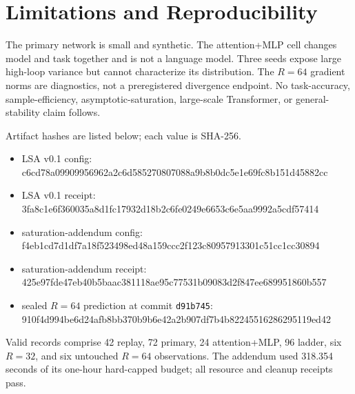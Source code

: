 \documentclass[10pt]{article}
\begin{document}
\section{Limitations and Reproducibility}

The primary network is small and synthetic. The attention+MLP cell changes
model and task together and is not a language model. Three seeds expose large
high-loop variance but cannot characterize its distribution. The $R=64$
gradient norms are diagnostics, not a preregistered divergence endpoint. No
task-accuracy, sample-efficiency, asymptotic-saturation, large-scale
Transformer, or general-stability claim follows.

Artifact hashes are listed below; each value is SHA-256.
\begin{itemize}
\item LSA v0.1 config:\\
{\scriptsize\ttfamily c6cd78a09909956962a2c6d585270807088a9b8b0dc5e1e69fc8b151d45882cc}
\item LSA v0.1 receipt:\\
{\scriptsize\ttfamily 3fa8c1e6f360035a8d1fc17932d18b2c6fe0249e6653c6e5aa9992a5cdf57414}
\item saturation-addendum config:\\
{\scriptsize\ttfamily f4eb1cd7d1df7a18f523498ed48a159ccc2f123c80957913301c51cc1cc30894}
\item saturation-addendum receipt:\\
{\scriptsize\ttfamily 425e97fde47eb40b5baac381118ae95c77531b09083d2f847ee689951860b557}
\item sealed $R=64$ prediction at commit \texttt{d91b745}:\\
{\scriptsize\ttfamily 910f4d994be6d24afb8bb370b9b6e42a2b907df7b4b82245516286295119ed42}
\end{itemize}
Valid records comprise 42 replay, 72 primary, 24
attention+MLP, 96 ladder, six $R=32$, and six untouched $R=64$ observations.
The addendum used 318.354 seconds of its one-hour hard-capped budget; all
resource and cleanup receipts pass.



\end{document}
